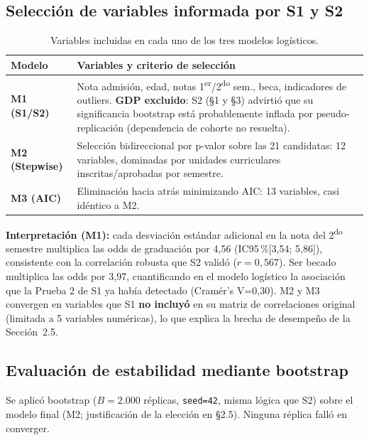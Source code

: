 \documentclass[11pt,a4paper]{article}
\begin{document}
\subsection{Selección de variables informada por S1 y S2}

\begin{table}[h]
\centering
\small
\begin{tabular}{@{}lp{9cm}@{}}
\toprule
Modelo & Variables y criterio de selección \\
\midrule
\textbf{M1 (S1/S2)} & Nota admisión, edad, notas 1\textsuperscript{er}/2\textsuperscript{do} sem., beca, indicadores de outliers. \textbf{GDP excluido}: S2 (\S1 y \S3) advirtió que su significancia bootstrap está probablemente inflada por pseudo-replicación (dependencia de cohorte no resuelta). \\
\textbf{M2 (Stepwise)} & Selección bidireccional por p-valor sobre las 21 candidatas: 12 variables, dominadas por unidades curriculares inscritas/aprobadas por semestre. \\
\textbf{M3 (AIC)} & Eliminación hacia atrás minimizando AIC: 13 variables, casi idéntico a M2. \\
\bottomrule
\end{tabular}
\caption{Variables incluidas en cada uno de los tres modelos logísticos.}
\label{tab:modelos_vars}
\end{table}

\textbf{Interpretación (M1):} cada desviación estándar adicional en la nota del 2\textsuperscript{do}
semestre multiplica las odds de graduación por 4{,}56 (IC95\,\%[3{,}54; 5{,}86]), consistente con
la correlación robusta que S2 validó ($r=0{,}567$). Ser becado multiplica las odds por 3{,}97,
cuantificando en el modelo logístico la asociación que la Prueba 2 de S1 ya había detectado
(Cramér's V=0{,}30). M2 y M3 convergen en variables que S1 \textbf{no incluyó} en su matriz de
correlaciones original (limitada a 5 variables numéricas), lo que explica la brecha de desempeño
de la Sección~2.5.

\subsection{Evaluación de estabilidad mediante bootstrap}

Se aplicó bootstrap ($B=2.000$ réplicas, \texttt{seed=42}, misma lógica que S2) sobre el modelo
final (M2; justificación de la elección en \S2.5). Ninguna réplica falló en converger.
\end{document}
